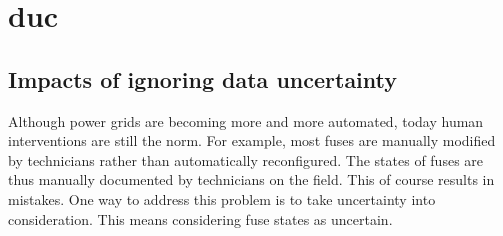 \section[Data uncertainty]{\Gls{duc}}
\label{sec:example:duc}

\subsection{Impacts of ignoring data uncertainty} 
\label{subsec:example-possible-consequences}
%
%

Although power grids are becoming more and more automated, today human interventions are still the norm.
For example, most fuses are manually modified by technicians rather than automatically reconfigured.
The states of fuses are thus manually documented by technicians on the field. 
This of course results in mistakes. 
One way to address this problem is to take uncertainty into consideration.
This means considering fuse states as uncertain.

